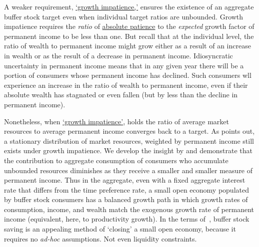 \documentclass[BufferStockTheory]{subfiles}
\begin{document}
% 

A weaker requirement, \hyperlink{GIC}{`growth impatience,'} ensures the existence of an aggregate buffer stock target even when individual target ratios are unbounded. %
Growth impatience requires the \textit{ratio} of \hyperlink{APFacDefn}{absolute patience} to the \textit{expected} growth factor of permanent income to be less than one.  But recall that at the individual level, the ratio of wealth to permanent income might grow either as a result of an increase in wealth or as the result of a decrease in permanent income.  Idiosyncratic uncertainty in permanent income means that in any given year there will be a portion of consumers whose permanent income has declined.  Such consumers wll experience an increase  in the ratio of wealth to permanent income, even if their absolute wealth has stagnated or even fallen (but by less than the decline in permanent income).

Nonetheless, when \hyperlink{GIC}{`growth impatience'}, holds the ratio of average market resources to average permanent income converges back to a target. As \cite{harmenbergInvariant} points out, a stationary distribution of market resources, weighted by permanent income still exists under growth impatience. We develop the insight by \cite{harmenbergInvariant} and demonstrate that the contribution to aggregate consumption of consumers who accumulate unbounded resources diminishes as they receive a smaller and smaller measure of permanent income. Thus in the aggregate, even with a fixed aggregate interest rate that differs from the time preference rate, a small open economy populated by buffer stock consumers has a balanced growth path in which growth rates of consumption, income, and wealth match the exogenous growth rate of permanent income (equivalent, here, to productivity growth). In the terms of~\cite{schmitt2003closing}, buffer stock saving is an appealing method of `closing' a small open economy, because it requires no \textit{ad-hoc} assumptions.  Not even liquidity constraints.

\begin{comment}
  \footnote{The paper's insights are instantiated in the {\ARKurl} toolkit, whose \href{https://hark.readthedocs.io/en/stable/reference/ConsumptionSaving/ConsIndShockModel.html}{buffer stock saving module} flags parametric choices under which a problem is degenerate or under which stable ratios of wealth to income may not exist.}
\end{comment}
\end{document}
